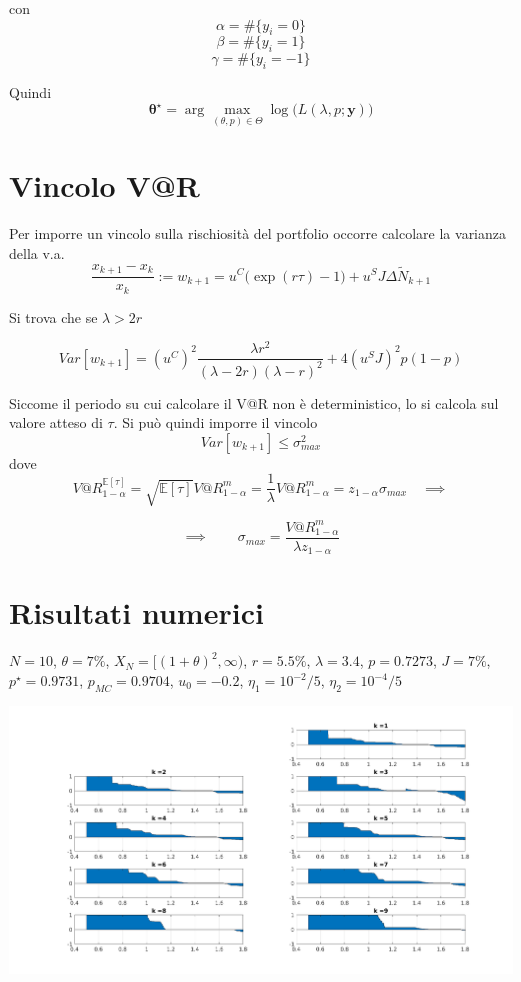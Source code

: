 \documentclass[12pt,a4paper]{article}
\theoremstyle{break}
\begin{document}
con 
\[ \alpha =  \#\{y_i = 0\}\]
\[ \beta =  \#\{y_i = 1\}\]
\[ \gamma =  \#\{y_i = -1\}\]

Quindi \[
\mathbf{\theta^{\star}} = \arg\max_{(\theta,p) \in \Theta} \log\Big( L(\lambda,p;\mathbf{y})\Big)
\]

\section{Vincolo V@R}
Per imporre un vincolo sulla rischiosità del portfolio occorre calcolare la varianza della v.a.
\begin{equation}
\frac{x_{k+1}-x_k}{x_k} := w_{k+1} = u^C\big(\exp(r \tau)-1\big) + u^S J\Delta \widetilde{N}_{k+1} 
\end{equation}

Si trova che se $ \lambda > 2 r$ 

\begin{equation}
Var[w_{k+1}] = (u^C)^2\frac{\lambda r^2}{(\lambda-2r)(\lambda-r)^2} + 4(u^S J)^2p(1-p)
\end{equation}

Siccome il periodo su cui calcolare il V@R non è deterministico, lo si calcola sul valore atteso di $\tau$. Si può quindi imporre il vincolo
\[
Var[w_{k+1}] \leq \sigma^2_{max}
\]
dove
\[
V@R^{\mathbb{E}[\tau]}_{1-\alpha} = \sqrt{\mathbb{E}[\tau]}V@R^m_{1-\alpha} = \frac{1}{\lambda}V@R^m_{1-\alpha} =  z_{1-\alpha}\sigma_{max} \quad \implies
\]

\[
\implies \qquad \boxed{\sigma_{max} = \frac{V@R^m_{1-\alpha}}{\lambda z_{1-\alpha}}}
\]

\section{Risultati numerici}
$N=10$, $\theta=7\%$, $X_N= [(1+\theta)^2,\infty)$, $r= 5.5\%$, $\lambda = 3.4$, $p = 0.7273$, $J=7\%$, $p^{\star}=0.9731$, $p_{MC} = 0.9704$, $u_0 = -0.2$, $\eta_1 = 10^{-2}/5$, $\eta_2 = 10^{-4}/5$

\centering
\includegraphics[scale = 0.5]{mapsBasic.png}
\end{document}
